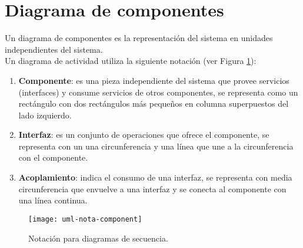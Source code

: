 \section{Diagrama de componentes}\label{sec:uml-comp}
Un diagrama de componentes es la representación del sistema en unidades independientes del sistema\cite{UMLClassroom, SoftwareEngineeringUML}.\\
Un diagrama de actividad utiliza la siguiente notación\cite{UMLClassroom, SoftwareEngineeringUML} (ver Figura \ref{fig:uml-nota-component}):
\begin{enumerate}
  \item \textbf{Componente}: es una pieza independiente del sistema que provee servicios (interfaces) y consume servicios de otros componentes, se representa como un rectángulo con dos rectángulos más pequeños en columna superpuestos del lado izquierdo.
  \item \textbf{Interfaz}: es un conjunto de operaciones que ofrece el componente, se representa con un una circunferencia y una línea que une a la circunferencia con el componente.
  \item \textbf{Acoplamiento}: indica el consumo de una interfaz, se representa con media circunferencia que envuelve a una interfaz y se conecta al componente con una línea continua.
\end{enumerate}

\begin{figure}[h]
  \centering
  \texttt{[image: uml-nota-component]}
  \caption{Notación para diagramas de secuencia\cite{SoftwareEngineeringUML}.}
  \label{fig:uml-nota-component}
\end{figure}

